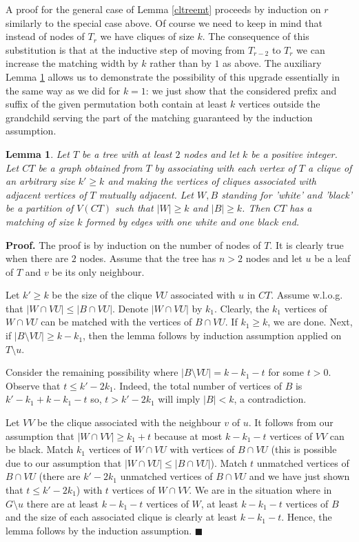 \documentclass{article}
\newtheorem{lemma}{Lemma}
\begin{document}
A proof for the general case of Lemma \ref{cltreemt} proceeds by induction on $r$ similarly
to the special case above. Of course we need to keep in mind that instead of nodes of $T_r$
we have cliques of size $k$. The consequence of this substitution is that at the inductive step
of moving from $T_{r-2}$ to $T_r$ we can increase the matching width by $k$ rather than by $1$
as above. The auxiliary Lemma \ref{kmatching} allows us to demonstrate the possibility of this
upgrade essentially in the same way as we did for $k=1$: we just show that the considered prefix 
and suffix of the given permutation both contain at least $k$ vertices outside the grandchild
serving the part of the matching guaranteed by the induction assumption. 

\begin{lemma} \label{kmatching}
Let $T$ be a tree with at least $2$ nodes and let $k$ be a positive integer.
Let $CT$ be a graph obtained from $T$ by associating
with each vertex of $T$ a clique of an arbitrary size $k' \geq k$
and making the vertices of cliques associated with adjacent vertices
of $T$ mutually adjacent. Let $W,B$ standing for 'white'
and 'black' be a partition of $V(CT)$ such that $|W| \geq k$
and $|B| \geq k$. Then $CT$ has a matching of size $k$ formed by edges
with one white and one black end.
\end{lemma}

{\bf Proof.}
The proof is by induction
on the number of nodes of $T$. It is clearly true when there are $2$ nodes.
Assume that the tree has $n>2$ nodes and let $u$ be a leaf of $T$
and $v$ be its only neighbour. 

Let $k' \geq k$ be the size of the clique $VU$ associated with $u$ in $CT$.
Assume w.l.o.g. that $|W \cap VU| \leq |B \cap VU|$. Denote $|W \cap VU|$
by $k_1$. Clearly, the $k_1$ vertices of $W \cap VU$ can be matched with the
vertices of $B \cap VU$. If $k_1 \geq k$, we are done. Next, 
if $|B \setminus VU| \geq k-k_1$, then the lemma follows by induction assumption
applied on $T \setminus u$.

Consider the remaining possibility where $|B \setminus VU|=k-k_1-t$ for some
$t>0$. Observe that $t \leq k'-2k_1$. Indeed, the total number of vertices of 
$B$ is $k'-k_1+k-k_1-t$ so, $t>k'-2k_1$ will imply $|B|<k$, a contradiction.

Let $VV$ be the clique associated 
with the neighbour $v$ of $u$. It follows from our assumption that $|W \cap VV| \geq k_1+t$
because at most $k-k_1-t$ vertices of $VV$ can be black. Match $k_1$ vertices
of $W \cap VU$ with vertices of $B \cap VU$ (this is possible due to our assumption that
$|W \cap VU| \leq |B \cap VU|$). Match $t$ unmatched vertices of 
$B \cap VU$ (there are $k'-2k_1$ unmatched vertices of $B \cap VU$ and we have just shown
that $t \leq k'-2k_1$) with $t$ vertices of $W \cap VV$. We are in the situation where
in $G \setminus u$ there are at least $k-k_1-t$ vertices of $W$, at least
$k-k_1-t$ vertices of $B$ and the size of each associated clique is clearly at 
least $k-k_1-t$. Hence, the lemma follows by the induction assumption.
$\blacksquare$
\end{document}
